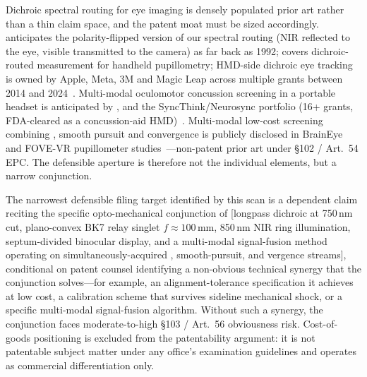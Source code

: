 Dichroic spectral routing for eye imaging is densely populated prior art rather than a thin claim space, and the patent moat must be sized accordingly. \citet{taboada1994} anticipates the polarity-flipped version of our spectral routing (NIR reflected to the eye, visible transmitted to the camera) as far back as 1992; \citet{neuropticspatent2017} covers dichroic-routed  measurement for handheld pupillometry; HMD-side dichroic eye tracking is owned by Apple, Meta, 3M and Magic Leap across multiple grants between 2014 and 2024~\cite{applewaveguide2023, mmreyetrack2018, oculusdichroic2019}. Multi-modal oculomotor concussion screening in a portable headset is anticipated by \citet{neurokineticshmd2017}, \citet{krueger2014ocular} and the SyncThink/Neurosync portfolio (16+ grants, FDA-cleared as a concussion-aid HMD)~\cite{syncthinkpatent2015}. Multi-modal low-cost screening combining , smooth pursuit and convergence is publicly disclosed in BrainEye~\cite{clough2025braineye} and FOVE-VR pupillometer studies~\cite{aleci2025fove}---non-patent prior art under \S102 / Art.~54 EPC. The defensible aperture is therefore not the individual elements, but a narrow conjunction.

The narrowest defensible filing target identified by this scan is a dependent claim reciting the specific opto-mechanical conjunction of [longpass dichroic at 750\,nm cut, plano-convex BK7 relay singlet $f \approx 100$\,mm, 850\,nm NIR ring illumination, septum-divided binocular display, and a multi-modal signal-fusion method operating on simultaneously-acquired , smooth-pursuit, and vergence streams], conditional on patent counsel identifying a non-obvious technical synergy that the conjunction solves---for example, an alignment-tolerance specification it achieves at low cost, a calibration scheme that survives sideline mechanical shock, or a specific multi-modal signal-fusion algorithm. Without such a synergy, the conjunction faces moderate-to-high \S103 / Art.~56 obviousness risk. Cost-of-goods positioning is excluded from the patentability argument: it is not patentable subject matter under any office's examination guidelines and operates as commercial differentiation only.

